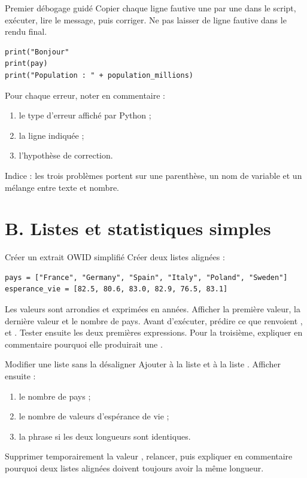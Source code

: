 \documentclass[11pt,a4paper]{article}
\begin{document}
\begin{mandatoryexercise}{Premier débogage guidé}
Copier chaque ligne fautive une par une dans le script, exécuter, lire le message, puis corriger. Ne pas laisser de ligne fautive dans le rendu final.
\begin{lstlisting}
print("Bonjour"
print(pay)
print("Population : " + population_millions)
\end{lstlisting}
Pour chaque erreur, noter en commentaire :
\begin{enumerate}
  \item le type d'erreur affiché par Python ;
  \item la ligne indiquée ;
  \item l'hypothèse de correction.
\end{enumerate}
Indice : les trois problèmes portent sur une parenthèse, un nom de variable et un mélange entre texte et nombre.
\end{mandatoryexercise}

\section*{B. Listes et statistiques simples}

\begin{mandatoryexercise}{Créer un extrait OWID simplifié}
Créer deux listes alignées :
\begin{lstlisting}
pays = ["France", "Germany", "Spain", "Italy", "Poland", "Sweden"]
esperance_vie = [82.5, 80.6, 83.0, 82.9, 76.5, 83.1]
\end{lstlisting}
Les valeurs sont arrondies et exprimées en années. Afficher la première valeur, la dernière valeur et le nombre de pays.
Avant d'exécuter, prédire ce que renvoient ,  et . Tester ensuite les deux premières expressions. Pour la troisième, expliquer en commentaire pourquoi elle produirait une .
\end{mandatoryexercise}

\begin{mandatoryexercise}{Modifier une liste sans la désaligner}
Ajouter  à la liste  et  à la liste . Afficher ensuite :
\begin{enumerate}
  \item le nombre de pays ;
  \item le nombre de valeurs d'espérance de vie ;
  \item la phrase  si les deux longueurs sont identiques.
\end{enumerate}
Supprimer temporairement la valeur , relancer, puis expliquer en commentaire pourquoi deux listes alignées doivent toujours avoir la même longueur.
\end{mandatoryexercise}
\end{document}
